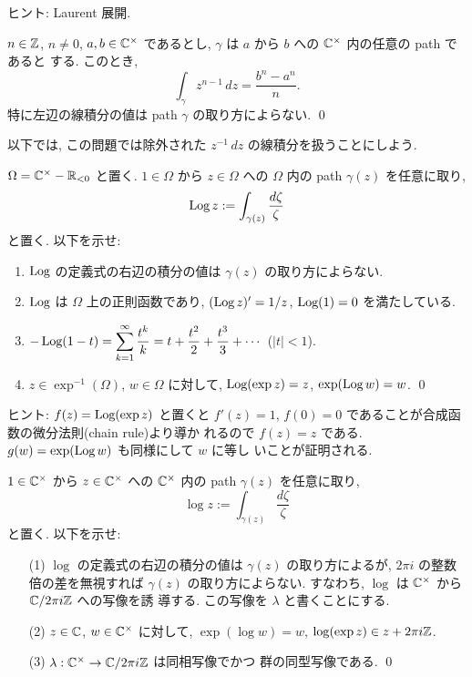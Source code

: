 \documentclass[12pt,twoside]{jarticle}
\def\setminus{-}
\def\Z{{\Bbb Z}} %
\def\R{{\Bbb R}} %
\def\C{{\Bbb C}} %
\def\Log{\mathop{\text{\rm Log}}\nolimits}
\begin{document}
\noindent ヒント: Laurent 展開.

\begin{question}
  $n\in\Z$, $n\ne0$, $a,b\in \C^{\times}$ であるとし, %
  $\gamma$ は $a$ から $b$ への $\C^{\times}$ 内の任意の path であると
  する. このとき, 
  \[
    \int_\gamma z^{n-1}\,dz = \frac{b^n - a^n}{n}.
  \]
  特に左辺の線積分の値は path $\gamma$ の取り方によらない. \qed
\end{question}

以下では, この問題では除外された $z^{-1}\,dz$ の線積分を扱うことにしよう.

\begin{question}
  $\Omega = \C^{\times} \setminus \R_{<0}$ と置く. %
  $1\in\Omega$ から $z\in\Omega$ への $\Omega$ 内の path $\gamma(z)$ %
  を任意に取り,
  \[
    \Log z := \int_{\gamma(z)} \frac{d\zeta}{\zeta}
  \]
  と置く. 以下を示せ:
  \begin{enumerate}
  \item $\Log$ の定義式の右辺の積分の値は $\gamma(z)$ の取り方によらない. 
  \item $\Log$ は $\Omega$ 上の正則函数であり, 
    $(\Log z)' = 1/z$, $\Log(1)=0$ を満たしている. 
  \item %
    \(\displaystyle
      - \Log(1-t) 
      = \sum_{k=1}^\infty \frac{t^k}{k}
      = t + \frac{t^2}{2} + \frac{t^3}{3} + \cdots
    \) %
    \quad ($|t|<1$).
  \item $z\in \exp^{-1}(\Omega)$, $w\in\Omega$ に対して, %
     $\Log(\exp z) = z$, $\exp(\Log w) = w$.
    \qed
  \end{enumerate}
\end{question}

\noindent ヒント: $f(z)=\Log(\exp z)$ と置くと %
$f'(z)=1$, $f(0)=0$ であることが合成函数の微分法則(chain rule)より導か
れるので $f(z)=z$ である. $g(w)=\exp(\Log w)$ も同様にして $w$ に等し
いことが証明される.

\begin{question}
  $1\in\C^{\times}$ から $z\in\C^{\times}$ への $\C^{\times}$ 内の
  path $\gamma(z)$ を任意に取り,
  \[
    \log z := \int_{\gamma(z)} \frac{d\zeta}{\zeta}
  \]
  と置く. 以下を示せ:
  \begin{enumerate}
  \item[(1)] $\log$ の定義式の右辺の積分の値は $\gamma(z)$ の取り方によるが,
    $2\pi i$ の整数倍の差を無視すれば $\gamma(z)$ の取り方によらない. 
    すなわち, $\log$ は $\C^{\times}$ から $\C/2\pi i\Z$ への写像を誘
    導する. この写像を $\lambda$ と書くことにする.
  \item[(2)] $z\in\C$, $w\in\C^{\times}$ に対して,
    $\exp(\log w) = w$, $\log(\exp z) \in z + 2\pi i\Z$.
  \item[(3)] $\lambda : \C^{\times} \to \C/2\pi i\Z$ は同相写像でかつ
    群の同型写像である. \qed
  \end{enumerate}
\end{question}
\end{document}
